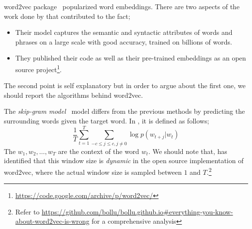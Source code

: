 word2vec package~\cite{mikolov_efficient_2013,mikolov_distributed_2013,mikolov_linguistic_2013} popularized word embeddings.
There are two aspects of the work done by \citeauthor{mikolov_distributed_2013}  that contributed to the fact;
\begin{itemize}
    \item Their model captures the semantic and syntactic attributes of words and phrases on a large scale with good accuracy, trained on billions of words.
    \item They published their code as well as their pre-trained embeddings as an open source project\footnote{\url{https://code.google.com/archive/p/word2vec/}}.
\end{itemize}
The second point is self explanatory but in order to argue about the first one, we should report the algorithms behind word2vec.

The \emph{skip-gram model}~\cite{mikolov_efficient_2013} model differs from the previous methods by predicting the surrounding words given the target word.
In , it is defined as follows;
\begin{equation}
    \frac{1}{T}\sum_{t=1}^{T}\sum_{-c \leq j \leq c, j \neq 0} \log p(w_{t+j}|w_t)
\end{equation}
The $w_{1}, w_{2}, \dots, w_{T}$ are the context of the word $w_t$.
We should note that, \textcite{levy_improving_2015} has identified that this window size is \emph{dynamic} in the open source implementation of word2vec, where the actual window size is sampled between $1$ and $T$.\footnote{Refer to \url{https://github.com/bollu/bollu.github.io\#everything-you-know-about-word2vec-is-wrong} for a comprehensive analysis}

